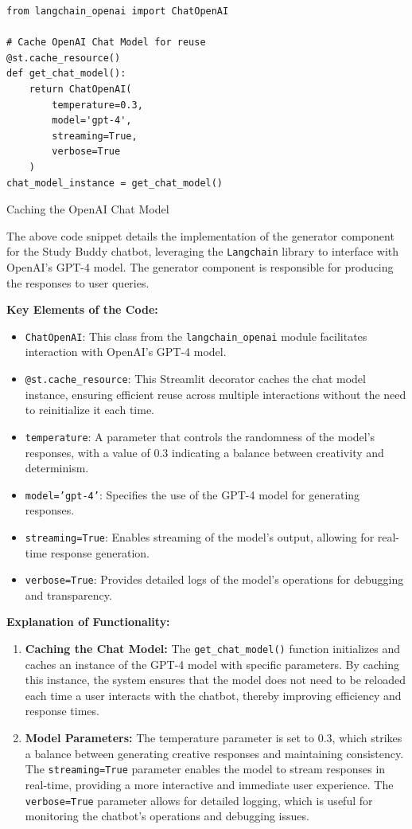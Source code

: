 \begin{listing}[H]
\begin{verbatim}
from langchain_openai import ChatOpenAI

# Cache OpenAI Chat Model for reuse
@st.cache_resource()
def get_chat_model():
    return ChatOpenAI(
        temperature=0.3,
        model='gpt-4',
        streaming=True,
        verbose=True
    )
chat_model_instance = get_chat_model()
\end{verbatim}
\caption{Caching the OpenAI Chat Model}
\label{listing:Cache_Chat_Model}
\end{listing}

The above code snippet details the implementation of the generator component for the Study Buddy chatbot, leveraging the \texttt{Langchain} library to interface with OpenAI's GPT-4 model. The generator component is responsible for producing the responses to user queries.

\textbf{Key Elements of the Code:}
\begin{itemize}
    \item \texttt{ChatOpenAI}: This class from the \texttt{langchain\_openai} module facilitates interaction with OpenAI's GPT-4 model.
    \item \texttt{@st.cache\_resource}: This Streamlit decorator caches the chat model instance, ensuring efficient reuse across multiple interactions without the need to reinitialize it each time.
    \item \texttt{temperature}: A parameter that controls the randomness of the model's responses, with a value of 0.3 indicating a balance between creativity and determinism.
    \item \texttt{model='gpt-4'}: Specifies the use of the GPT-4 model for generating responses.
    \item \texttt{streaming=True}: Enables streaming of the model's output, allowing for real-time response generation.
    \item \texttt{verbose=True}: Provides detailed logs of the model's operations for debugging and transparency.
\end{itemize}

\textbf{Explanation of Functionality:}
\begin{enumerate}
    \item \textbf{Caching the Chat Model:} The \texttt{get\_chat\_model()} function initializes and caches an instance of the GPT-4 model with specific parameters. By caching this instance, the system ensures that the model does not need to be reloaded each time a user interacts with the chatbot, thereby improving efficiency and response times.
    \item \textbf{Model Parameters:} The temperature parameter is set to 0.3, which strikes a balance between generating creative responses and maintaining consistency. The \texttt{streaming=True} parameter enables the model to stream responses in real-time, providing a more interactive and immediate user experience. The \texttt{verbose=True} parameter allows for detailed logging, which is useful for monitoring the chatbot's operations and debugging issues.
\end{enumerate}

